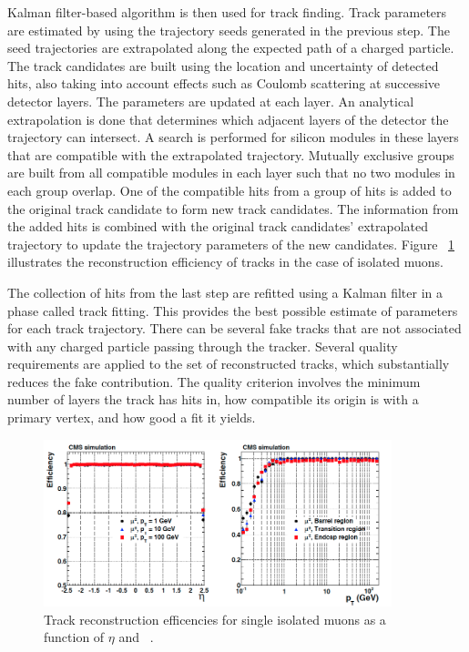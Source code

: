 Kalman filter-based algorithm is then used for track finding. Track parameters are estimated by using the trajectory seeds generated in the previous step. The seed trajectories are extrapolated along the expected path of a charged particle. The track candidates are built using the location and uncertainty of detected hits, also taking into account effects such as Coulomb scattering at successive detector layers. The parameters are updated at each layer. An analytical extrapolation is done that determines which adjacent layers of the detector the trajectory can intersect. A search is performed for silicon modules in these layers that are compatible with the extrapolated trajectory. Mutually exclusive groups are built from all compatible modules in each layer such that no two modules in each group overlap. One of the compatible hits from a group of hits is added to the original track candidate to form new track candidates. The information from the added hits is combined with the original track candidates' extrapolated trajectory to update the trajectory parameters of the new candidates. Figure ~\ref{fig:trackrecon} illustrates the reconstruction efficiency of tracks in the case of isolated muons.

The collection of hits from the last step are refitted using a Kalman filter in a phase called track fitting. This provides the best possible estimate of parameters for each track trajectory. There can be several fake tracks that are not associated with any charged particle passing through the tracker. Several quality requirements are applied to the set of reconstructed tracks, which substantially reduces the fake contribution. The quality criterion involves the minimum number of layers the track has hits in, how compatible its origin is with a primary vertex, and how good a fit it yields.

\begin{figure}
  \begin{center}
    \captionsetup{width=0.9\textwidth,justification=centering}
    \includegraphics[width=0.9\textwidth,keepaspectratio]{plots/chapter4/trackrecon.png}
    \caption{Track reconstruction efficencies for single isolated muons as a function of $\eta$ and \pt ~\cite{Chatrchyan:2014fea}.}
    \label{fig:trackrecon}
  \end{center}
\end{figure}

